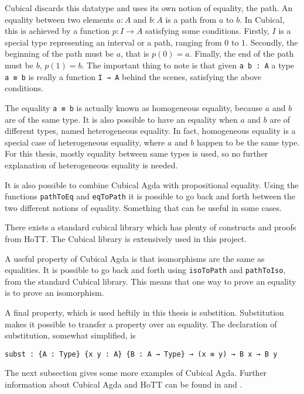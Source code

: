 Cubical discards this datatype and uses its own notion of equality, the path. An equality between two elements $a : A$ and $b : A$ is a path from $a$ to $b$. In Cubical, this is achieved by a function $p : I \rightarrow A$ satisfying some conditions. Firstly, $I$ is a special type representing an interval or a path, ranging from $0$ to $1$. Secondly, the beginning of the path must be $a$, that is $p(0)=a$. Finally, the end of the path must be $b$, $p(1)=b$. The important thing to note is that given \texttt{a b : A} a type \texttt{a ≡ b} is really a function \texttt{I → A} behind the scenes, satisfying the above conditions. 

The equality \texttt{a ≡ b} is actually known as homogeneous equality, because $a$ and $b$ are of the same type. It is also possible to have an equality when $a$ and $b$ are of different types, named heterogeneous equality. In fact, homogeneous equality is a special case of heterogeneous equality, where $a$ and $b$ happen to be the same type. For this thesis, mostly equality between same types is used, so no further explanation of heterogeneous equality is needed.

It is also possible to combine Cubical Agda with propositional equality. Using the functions \texttt{pathToEq} and \texttt{eqToPath} it is possible to go back and forth between the two different notions of equality. Something that can be useful in some cases.

There exists a standard cubical library \cite{cubicalLibrary} which has plenty of constructs and proofs from HoTT. The Cubical library is extensively used in this project.

A useful property of Cubical Agda is that isomorphisms are the same as equalities. It is possible to go back and forth using \texttt{isoToPath} and \texttt{pathToIso}, from the standard Cubical library. This means that one way to prove an equality is to prove an isomorphism.

A final property, which is used heftily in this thesis is substition. Substitution makes it possible to transfer a property over an equality. The declaration of substitution, somewhat simplified, is 

\begin{verbatim}
subst : {A : Type} {x y : A} {B : A → Type} → (x ≡ y) → B x → B y
\end{verbatim}

The next subsection gives some more examples of Cubical Agda. Further information about Cubical Agda and HoTT can be found in  \cite{cubicalPaper} and \cite{hottBook}.

